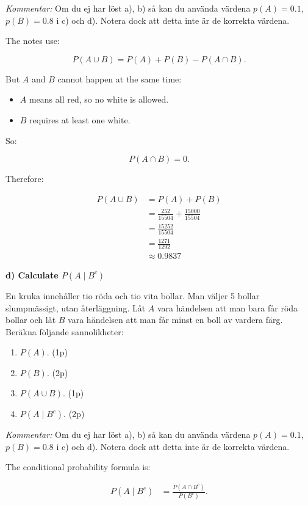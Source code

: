 \documentclass[10pt]{article}
\begin{document}
\textit{Kommentar:}
Om du ej har löst a), b) så kan du använda värdena
$p(A)=0.1$, $p(B)=0.8$ i c) och d).
Notera dock att detta inte är de korrekta värdena.

The notes use:

\[
P(A\cup B)
=P(A)+P(B)-P(A\cap B).
\]

But $A$ and $B$ cannot happen at the same time:

\begin{itemize}
\item $A$ means all red, so no white is allowed.
\item $B$ requires at least one white.
\end{itemize}

So:

\[
P(A\cap B)=0.
\]

Therefore:

\begin{align*}
P(A\cup B)
&=
P(A)+P(B) \\[2mm]
&=
\frac{252}{15504}
+\frac{15000}{15504} \\[2mm]
&=
\frac{15252}{15504} \\[2mm]
&=
\frac{1271}{1292} \\[2mm]
&\approx 0.9837
\end{align*}

\textbf{d) Calculate $P(A\mid B^c)$}

En kruka innehåller tio röda och tio vita bollar.
Man väljer 5 bollar slumpmässigt, utan återläggning.
Låt $A$ vara händelsen att man bara får röda bollar och låt
$B$ vara händelsen att man får minst en boll av vardera färg.
Beräkna följande sannolikheter:

\begin{enumerate}[label=\alph*)]
\item $P(A)$. \hfill (1p)
\item $P(B)$. \hfill (2p)
\item $P(A\cup B)$. \hfill (1p)
\item $P(A\mid B^c)$. \hfill (2p)
\end{enumerate}

\textit{Kommentar:}
Om du ej har löst a), b) så kan du använda värdena
$p(A)=0.1$, $p(B)=0.8$ i c) och d).
Notera dock att detta inte är de korrekta värdena.

The conditional probability formula is:

\begin{align*}
P(A\mid B^c)
&=
\frac{P(A\cap B^c)}
{P(B^c)}.
\end{align*}
\end{document}
